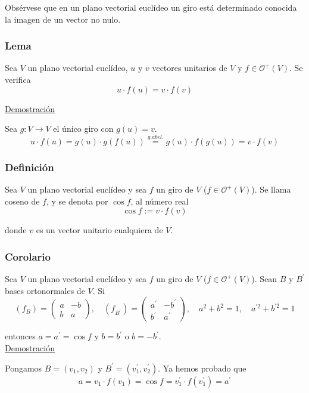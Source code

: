 \documentclass[12pt, a4paper, ones, notitlepage, openany,titlepage]{article}
\newcommand{\demostracion}{\noindent\underline{Demostración}}
\begin{document}
Obsérvese que en un plano vectorial euclídeo un giro está determinado conocida la imagen de un vector no nulo.

\subsubsection{Lema}
Sea $V$ un plano vectorial euclídeo, $u$ y $v$ vectores unitarios de $V$ y $f \in \mathcal{O}^{+}(V)$. Se verifica
$$
u \cdot f(u)=v \cdot f(v)
$$

\demostracion

\noindent Sea $g : V \longrightarrow V$ el único giro con $g(u) = v$.
$$
u \cdot f(u)=g(u) \cdot g(f(u)) \overset{g. abel.}{=} g(u) \cdot f(g(u))=v \cdot f(v)
$$

\subsubsection{Definición}
Sea $V$ un plano vectorial euclídeo y sea $f$ un giro de $V$ ($f \in \mathcal{O}^+(V)$). Se llama coseno de $f$, y se denota por $\cos f$, al número real
$$
\cos f:=v \cdot f(v)
$$

\noindent donde $v$ es un vector unitario cualquiera de $V$.

\subsubsection{Corolario}
Sea $V$ un plano vectorial euclídeo y sea $f$ un giro de $V$ ($f \in \mathcal{O}^+(V)$). Sean $B$ y $B^{\prime}$ bases ortonormales de $V$. Si
$$
(f_{B})=\left(\begin{array}{rr}
	a & -b \\
	b & a
\end{array}\right), \quad (f_{B^{\prime}})=\left(\begin{array}{rr}
	a^{\prime} & -b^{\prime} \\
	b^{\prime} & a^{\prime}
\end{array}\right), \quad a^{2}+b^{2}=1, \quad a^{\prime 2}+b^{\prime 2}=1
$$

\noindent entonces $a=a^{\prime}=\cos f$ y $b= b^{\prime}$ o $b= -b^{\prime}$.\\

\demostracion

Pongamos $B=\left(v_{1}, v_{2}\right)$ y $B^{\prime}=\left(v_{1}^{\prime}, v_{2}^{\prime}\right)$. Ya hemos probado que
$$
a=v_{1} \cdot f\left(v_{1}\right)=\cos f=v_{1}^{\prime} \cdot f\left(v_{1}^{\prime}\right)=a^{\prime}
$$
\end{document}
